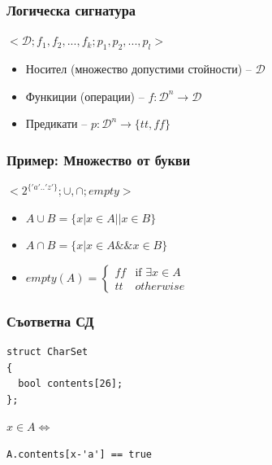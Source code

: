 \documentclass{beamer}
\begin{document}
\begin{frame}[fragile]
\frametitle{Логическа сигнатура}


\begin{center}
$<\mathcal{D};f_1,f_2,...,f_k;p_1,p_2,...,p_l>$
\end{center}

\begin{itemize}
  \item Носител (множество допустими стойности) -- $\mathcal{D}$
  \item Функиции (операции) -- $f:\mathcal{D}^{n}\rightarrow\mathcal{D}$
  \item Предикати -- $p:\mathcal{D}^{n}\rightarrow\{tt,ff\}$
\end{itemize}

\end{frame}


\begin{frame}[fragile]
\frametitle{Пример: Множество от букви}


\begin{center}
$<2^{\{'a'..'z'\}};\cup,\cap;empty >$
\end{center}

\begin{itemize}
  \item $A \cup B = \{x | x \in A || x \in B\}$
  \item $A \cap B = \{x | x \in A \&\& x \in B\}$
  \item $empty(A) = \left\{
  \begin{array}{ll}
    ff  & \mbox{if } \exists x \in A \\
    tt & otherwise
  \end{array}
\right.$
\end{itemize}

\end{frame}


\begin{frame}[fragile]
\frametitle{Съответна СД}


\begin{flushleft}
\begin{lstlisting}
struct CharSet
{
  bool contents[26];
};
\end{lstlisting}
\end{flushleft}

\begin{flushleft}
$x \in A \Leftrightarrow $
\begin{lstlisting}
A.contents[x-'a'] == true
\end{lstlisting}
\end{flushleft}

\end{frame}
\end{document}
